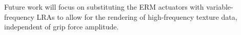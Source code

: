 \documentclass[12pt, a4paper]{report}
\begin{document}
Future work will focus on substituting the ERM actuators with variable-frequency LRAs to allow for the rendering of high-frequency texture data, independent of grip force amplitude.

\printbibliography[heading=bibintoc]
\end{document}
